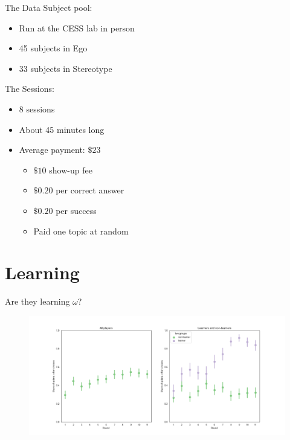 \documentclass[aspectratio=169]{beamer}
\begin{document}
\begin{frame}{The Data}
    Subject pool:\\
    \begin{itemize}
        \item Run at the CESS lab in person
        \item 45 subjects in Ego
        \item 33 subjects in Stereotype
    \end{itemize}
    \bigskip
    The Sessions:
    \begin{itemize}
        \item 8 sessions 
        \item About 45 minutes long
        \item Average payment: $\$23$
        \begin{itemize}
            \item $\$10$ show-up fee
            \item $\$ 0.20$ per correct answer
            \item $\$ 0.20$ per success
            \item Paid one topic at random
        \end{itemize}
    \end{itemize}
    
\end{frame}

\section*{Learning}

\begin{frame}{Are they learning $\omega$?}
    \begin{figure}
        \centering
        \includegraphics[scale=.4]{learning_groups.png}
    \end{figure}

\end{frame}
\end{document}
